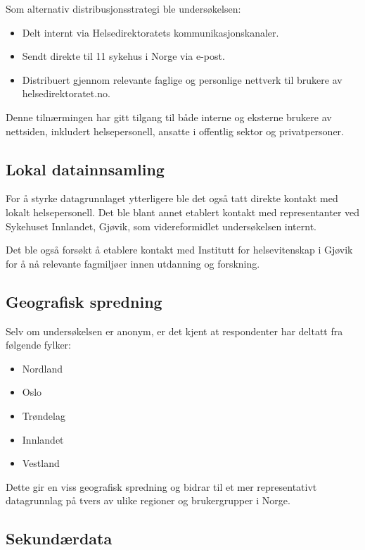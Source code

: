 Som alternativ distribusjonsstrategi ble undersøkelsen:
\begin{itemize}
    \item Delt internt via Helsedirektoratets kommunikasjonskanaler.
    \item Sendt direkte til 11 sykehus i Norge via e-post.
    \item Distribuert gjennom relevante faglige og personlige nettverk til brukere av helsedirektoratet.no.
\end{itemize}

Denne tilnærmingen har gitt tilgang til både interne og eksterne brukere av nettsiden, inkludert helsepersonell, ansatte i offentlig sektor og privatpersoner.

\subsection{Lokal datainnsamling}

For å styrke datagrunnlaget ytterligere ble det også tatt direkte kontakt med lokalt helsepersonell. Det ble blant annet etablert kontakt med representanter ved Sykehuset Innlandet, Gjøvik, som videreformidlet undersøkelsen internt.

Det ble også forsøkt å etablere kontakt med Institutt for helsevitenskap i Gjøvik for å nå relevante fagmiljøer innen utdanning og forskning.

\subsection{Geografisk spredning}

Selv om undersøkelsen er anonym, er det kjent at respondenter har deltatt fra følgende fylker:

\begin{itemize}
    \item Nordland
    \item Oslo
    \item Trøndelag
    \item Innlandet
    \item Vestland
\end{itemize}

Dette gir en viss geografisk spredning og bidrar til et mer representativt datagrunnlag på tvers av ulike regioner og brukergrupper i Norge.

\subsection{Sekundærdata}

